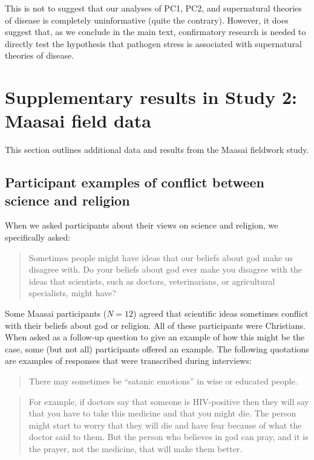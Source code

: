 \documentclass[
]{article}
\begin{document}
This is not to suggest that our analyses of PC1, PC2, and supernatural theories of disease is completely uninformative (quite the contrary). However, it does suggest that, as we conclude in the main text, confirmatory research is needed to directly test the hypothesis that pathogen stress is associated with supernatural theories of disease.

\newpage

\hypertarget{supplementary-results-in-study-2-maasai-field-data}{%
\section{Supplementary results in Study 2: Maasai field data}\label{supplementary-results-in-study-2-maasai-field-data}}

This section outlines additional data and results from the Maasai fieldwork study.

\hypertarget{participant-examples-of-conflict-between-science-and-religion}{%
\subsection{Participant examples of conflict between science and religion}\label{participant-examples-of-conflict-between-science-and-religion}}

When we asked participants about their views on science and religion, we specifically asked:

\begin{quote}
Sometimes people might have ideas that our beliefs about god make us disagree with. Do your beliefs about god ever make you disagree with the ideas that scientists, such as doctors, veterinarians, or agricultural specialists, might have?
\end{quote}

Some Maasai participants (\(N=12\)) agreed that scientific ideas sometimes conflict with their beliefs about god or religion. All of these participants were Christians. When asked as a follow-up question to give an example of how this might be the case, some (but not all) participants offered an example. The following quotations are examples of responses that were transcribed during interviews:

\begin{quote}
There may sometimes be ``satanic emotions'' in wise or educated people.
\end{quote}

\begin{quote}
For example, if doctors say that someone is HIV-positive then they will say that you have to take this medicine and that you might die. The person might start to worry that they will die and have fear because of what the doctor said to them. But the person who believes in god can pray, and it is the prayer, not the medicine, that will make them better.
\end{quote}
\end{document}
